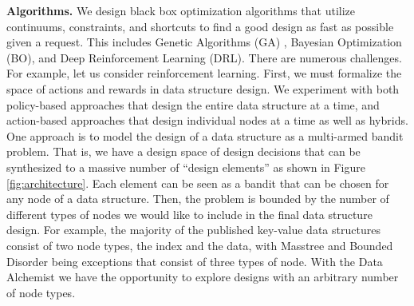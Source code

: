 \documentclass[11pt]{article}
\begin{document}
\textbf{Algorithms.} We design black box optimization algorithms that utilize continuums, constraints, and shortcuts to find a good design as fast as possible given a request.  This includes Genetic Algorithms (GA) \cite{Idreos2017}, Bayesian Optimization (BO), and Deep Reinforcement Learning (DRL). There are numerous challenges. For example, let us consider reinforcement learning. First, we must formalize the space of actions and rewards in data structure design. We experiment with both policy-based approaches that design the entire data structure at a time, and action-based approaches that design individual nodes at a time as well as hybrids. One approach is to model the design of a data structure as a multi-armed bandit problem. That is, we have a design space of design decisions that can be synthesized to a massive number of ``design elements'' as shown in Figure \ref{fig:architecture}. Each element can be seen as a bandit that can be chosen for any node of a data structure. Then, the problem is bounded by the number of different types of nodes we would like to include in the final data structure design. For example, the majority of the published key-value data structures consist of two node types, the index and the data, with Masstree \cite{Mao2012} and Bounded Disorder \cite{Litwin1986} being exceptions that consist of three types of node. With the Data Alchemist we have the opportunity to explore designs with an arbitrary number of node types.
\end{document}
